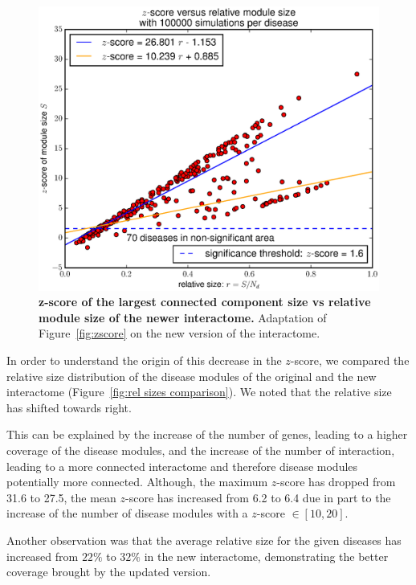 \documentclass[letterpaper]{article}
\begin{document}
	\begin{figure}[h!]
		\centering
		\includegraphics[width=.5\textwidth]{images/new_interactome_S4.b100000.eps}
		\vspace{-.7cm}
		\caption{{\bf z-score of the largest connected component size vs relative module size of the newer interactome.}
		Adaptation of Figure~\ref{fig:zscore} on the new version of the interactome.
		\label{fig:new interactome zscore}}
	\end{figure}

	In order to understand the origin of this decrease in the $z$-score, we compared the relative size
	distribution of the disease modules of the original and the new interactome
	(Figure~\ref{fig:rel sizes comparison}). We noted that the relative size has shifted towards right.

	This can be explained by the increase of the number of genes, leading to a higher coverage of the disease
	modules, and the increase of the number of interaction, leading to a more connected interactome and
	therefore disease modules potentially more connected. Although, the maximum $z$-score has dropped from
	31.6 to 27.5, the mean $z$-score has increased from 6.2 to 6.4 due in part to the increase of the number
	of disease modules with a $z$-score $\in [10, 20]$.

	Another observation was that the average relative size for the given diseases has increased from $22\%$
	to $32\%$ in the new interactome, demonstrating the better coverage brought by the updated version.
\end{document}
